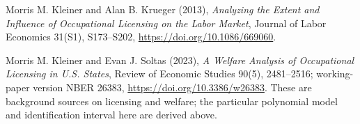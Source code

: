 \documentclass[11pt,a4paper]{article}
\theoremstyle{definition}
\theoremstyle{remark}
\begin{document}
Morris M. Kleiner and Alan B. Krueger (2013), \emph{Analyzing the Extent and Influence of Occupational Licensing on the Labor Market}, Journal of Labor Economics 31(S1), S173--S202, \url{https://doi.org/10.1086/669060}.

Morris M. Kleiner and Evan J. Soltas (2023), \emph{A Welfare Analysis of Occupational Licensing in U.S. States}, Review of Economic Studies 90(5), 2481--2516; working-paper version NBER 26383, \url{https://doi.org/10.3386/w26383}. These are background sources on licensing and welfare; the particular polynomial model and identification interval here are derived above.
\end{document}
